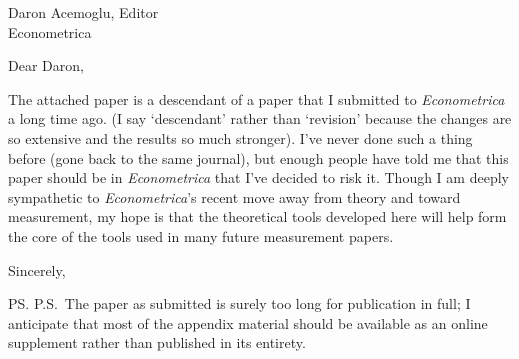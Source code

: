 \documentclass[12pt]{letter}
\begin{document}
\begin{letter}{
Daron Acemoglu, Editor \\
Econometrica
}

\opening{Dear Daron,}

The attached paper is a descendant of a paper that I submitted to {\it
  Econometrica} a long time ago.  (I say `descendant' rather than
`revision' because the changes are so extensive and the results so
much stronger).  I've never done such a thing before (gone back to the
same journal), but enough people have told me that this paper should
be in {\it Econometrica} that I've decided to risk it.
Though I am deeply sympathetic to {\it Econometrica}'s recent move
away from theory and toward measurement, my hope is that the theoretical tools
developed here will help form the core of the tools used in many future
measurement papers.  

\closing{Sincerely,}

\ps{P.S.\  The paper as submitted is surely too long for publication in
  full; I anticipate that most of the appendix material should be
  available as an online supplement rather than published in its
  entirety.}

\end{letter}
\end{document}
